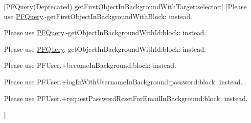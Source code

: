 \begin{DoxyRefList}
\hypertarget{deprecated__deprecated000036}{}%
\hyperlink{category_p_f_query_07_deprecated_08_a24c6281aa758bcbe31e1af11ce68d196}{\mbox{[}P\+F\+Query(Deprecated) get\+First\+Object\+In\+Background\+With\+Target\+:selector\+:\mbox{]}} ]Please use {\ttfamily \hyperlink{class_p_f_query}{P\+F\+Query}.-\/get\+First\+Object\+In\+Background\+With\+Block\+:} instead.  
\item[\label{deprecated__deprecated000034}%
\hypertarget{deprecated__deprecated000034}{}%
\hyperlink{category_p_f_query_07_deprecated_08_a9bc4148cc7b00da6409df69dd89a7563}{\mbox{[}P\+F\+Query(Deprecated) get\+Object\+In\+Background\+With\+Id\+:target\+:selector\+:\mbox{]}} ]Please use {\ttfamily \hyperlink{class_p_f_query}{P\+F\+Query}.-\/get\+Object\+In\+Background\+With\+Id\+:block\+:} instead.  
\item[\label{deprecated__deprecated000034}%
\hypertarget{deprecated__deprecated000034}{}%
\hyperlink{category_p_f_query_07_deprecated_08_a9bc4148cc7b00da6409df69dd89a7563}{\mbox{[}P\+F\+Query(Deprecated) get\+Object\+In\+Background\+With\+Id\+:target\+:selector\+:\mbox{]}} ]Please use {\ttfamily \hyperlink{class_p_f_query}{P\+F\+Query}.-\/get\+Object\+In\+Background\+With\+Id\+:block\+:} instead.  
\item[\label{deprecated__deprecated000041}%
\hypertarget{deprecated__deprecated000041}{}%
\hyperlink{category_p_f_user_07_deprecated_08_a8078303b4f51781e429cd2482b003d73}{\mbox{[}P\+F\+User(Deprecated) become\+In\+Background\+:target\+:selector\+:\mbox{]}} ]Please use {\ttfamily P\+F\+User.+become\+In\+Background\+:block\+:} instead.  
\item[\label{deprecated__deprecated000040}%
\hypertarget{deprecated__deprecated000040}{}%
\hyperlink{category_p_f_user_07_deprecated_08_af734a968312e3fa6bd6836770c84193f}{\mbox{[}P\+F\+User(Deprecated) log\+In\+With\+Username\+In\+Background\+:password\+:target\+:selector\+:\mbox{]}} ]Please use {\ttfamily P\+F\+User.+log\+In\+With\+Username\+In\+Background\+:password\+:block\+:} instead.  
\item[\label{deprecated__deprecated000042}%
\hypertarget{deprecated__deprecated000042}{}%
\hyperlink{category_p_f_user_07_deprecated_08_a86775d2489953988c8e20838b26fb6d4}{\mbox{[}P\+F\+User(Deprecated) request\+Password\+Reset\+For\+Email\+In\+Background\+:target\+:selector\+:\mbox{]}} ]Please use {\ttfamily P\+F\+User.+request\+Password\+Reset\+For\+Email\+In\+Background\+:block\+:} instead.  
\item[\label{deprecated__deprecated000039}%
\hypertarget{deprecated__deprecated000039}{}%

\end{DoxyRefList}
